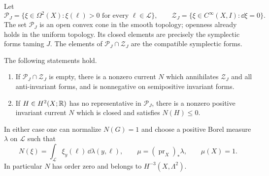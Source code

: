 Let
\[
 \mathcal P_J=\{\xi\in\Omega^2(X):\xi(\ell)>0
                    \text{ for every }\ell\in\mathcal L\},
 \qquad
 \mathcal Z_J=\{\xi\in C^\infty(X,I):\dd\xi=0\}.
\]
The set $\mathcal P_J$ is an open convex cone in the smooth topology;
openness already holds in the uniform topology.  Its closed elements are
precisely the symplectic forms taming $J$.  The elements of
$\mathcal P_J\cap\mathcal Z_J$ are the compatible symplectic forms.

\begin{lemma}\label{lem:current-separators}
The following statements hold.
\begin{enumerate}[label=\textup{(\roman*)}]
\item If $\mathcal P_J\cap\mathcal Z_J$ is empty, there is a nonzero current
 $N$ which annihilates $\mathcal Z_J$ and all anti-invariant forms, and is
 nonnegative on semipositive invariant forms.
\item If $H\in H^2(X;\mathbb R)$ has no representative in $\mathcal P_J$, there
 is a nonzero positive invariant current $N$ which is closed and satisfies
 $N(H)\le0$.
\end{enumerate}
In either case one can normalize $N(G)=1$ and choose a positive Borel
measure $\lambda$ on $\mathcal L$ such that
\begin{equation}\label{eq:current-line-measure}
 N(\xi)=\int_{\mathcal L}\xi_y(\ell)\,\dd\lambda(y,\ell),
 \qquad \mu=(\operatorname{pr}_X)_*\lambda,
 \qquad \mu(X)=1.
\end{equation}
In particular $N$ has order zero and belongs to $H^{-3}(X,\Lambda^2)$.
\end{lemma}

